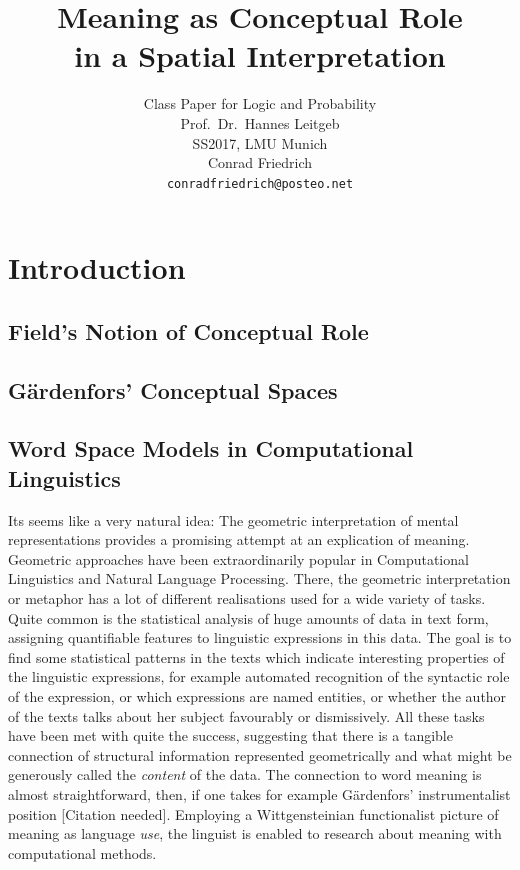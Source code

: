 \documentclass[11pt, a4paper]{article}
\title{\osfamily\textbf{Meaning as Conceptual Role}\\ in a Spatial Interpretation}
\author{Class Paper for Logic and Probability \\ Prof.\ Dr.\ Hannes Leitgeb \\ SS2017, LMU Munich \\ Conrad Friedrich \\ \texttt{conradfriedrich@posteo.net}}
\renewcommand{\i}[1]{\emph{#1}}
\begin{document}
\maketitle
{}
\thispagestyle{empty}
\newpage
\tableofcontents
\newpage
\section{Introduction}

\subsection{Field's Notion of Conceptual Role}
\subsection{Gärdenfors' Conceptual Spaces}
\subsection{Word Space Models in Computational Linguistics}
Its seems like a very natural idea: The geometric interpretation of mental representations provides a promising attempt at an explication of meaning. Geometric approaches have been extraordinarily popular in Computational Linguistics and Natural Language Processing. There, the geometric interpretation or metaphor has a lot of different realisations used for a wide variety of tasks. Quite common is the statistical analysis of huge amounts of data in text form, assigning quantifiable features to linguistic expressions in this data. The goal is to find some statistical patterns in the texts which indicate interesting properties of the linguistic expressions, for example automated recognition of the syntactic role of the expression, or which expressions are named entities, or whether the author of the texts talks about her subject favourably or dismissively. All these tasks have been met with quite the success, suggesting that there is a tangible connection of structural information represented geometrically and what might be generously called the \i{content} of the data. The connection to word meaning is almost straightforward, then, if one takes for example Gärdenfors' instrumentalist position [Citation needed]. Employing a Wittgensteinian functionalist picture of meaning as language \i{use}, the linguist is enabled to research about meaning with computational methods.
\end{document}

